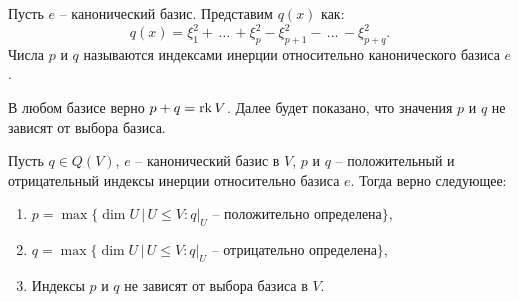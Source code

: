 \begin{definition}
    Пусть $e$ -- канонический базис. Представим $q(x)$ как: 
    $$q(x) = \xi_1^2 + \, \dots \,+ \xi_p^2 - \xi^2_{p+1} - \, \dots \,- \xi^2_{p+q}.$$ 
    Числа $p$ и $q$ называются индексами инерции относительно канонического базиса $e$.
\end{definition}

\begin{note}
    В любом базисе верно $p + q = \operatorname{rk} V$. Далее будет показано, что значения $p$ и $q$ не зависят 
    от выбора базиса.
\end{note}

\begin{theorem}
    Пусть $q \in Q(V)$, $e$ -- канонический базис в $V$, $p$ и $q$ -- положительный и отрицательный 
    индексы инерции относительно базиса $e$. Тогда верно следующее: 
    \begin{enumerate}
        \item $p = \max\{\dim U \, \vert \, U \leq V : q \vert_{U} \text{ -- положительно определена}\}$,
        \item $q = \max\{\dim U \, \vert \, U \leq V : q \vert_{U} \text{ -- отрицательно определена}\}$,
        \item Индексы $p$ и $q$ не зависят от выбора базиса в $V$.
    \end{enumerate}
\end{theorem}

